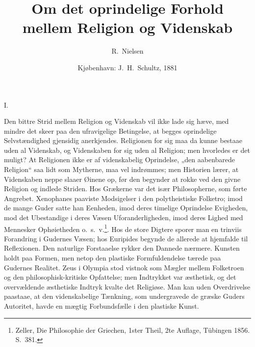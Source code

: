 \documentclass[12pt,a4paper]{article}
\title{\textbf{Om det oprindelige Forhold\\[4pt]
       mellem Religion og Videnskab}}
\author{R.\ Nielsen}
\date{Kjøbenhavn: J.\ H.\ Schultz, 1881}
\newcommand{\opage}[1]{\marginnote{\footnotesize\textit{[#1]}}}
\begin{document}
\maketitle
\thispagestyle{fancy}

\bigskip

\begin{center}I.\end{center}

\noindent Den bittre Strid mellem Religion og Videnskab vil ikke lade
sig hæve, med mindre det skeer paa den ufravigelige Betingelse,
at begges oprindelige Selvstændighed gjensidig anerkjendes. Religionen
for sig maa da kunne bestaae uden al Videnskab, og Videnskaben for sig
uden al Religion; men hvorledes er det muligt? At Religionen ikke er
af videnskabelig Oprindelse, „den aabenbarede Religion“ saa lidt som
Mytherne, maa vel indrømmes; men Historien lærer, at Videnskaben neppe
slaaer Øinene op, før den begynder at rokke ved den givne Religion og
indlede Striden. Hos Grækerne var det især Philosopherne, som førte
Angrebet. Xenophanes paaviste Modsigelser i den polytheistiske
Folketro; imod de mange Guder satte han Eenheden, imod deres timelige
Oprindelse Evigheden, mod det Ubestandige i deres Væsen
Uforanderligheden, imod deres Lighed med Mennesker Ophøietheden
o.\ s.\ v.\footnote{Zeller, Die Philosophie der Griechen, 1ster
Theil, 2te Auflage, Tübingen 1856. S.\ 381.}. %
Hos de store Digtere
sporer man en trinviis Forandring i Gudernes Væsen; hos Euripides begynde
de allerede at hjemfalde til Reflexionen. Den naturlige Forstaaelse
rykker den Dannede nærmere. Kunsten holdt paa Formen, men netop den
plastiske Formfuldendelse tærede paa Gudernes Realitet. Zeus i Olympia
stod vistnok som Mægler mellem Folketroen og den philosophisk-kritiske
Opfattelse; men Indtrykket var æsthetisk, og det overvældende æsthetiske
Indtryk kvalte det Religiøse. Man \opage{2} kan uden Overdrivelse paastaae, at
den videnskabelige Tænkning, som undergravede de græske Guders
Autoritet, havde en mægtig Forbundsfælle i den plastiske Kunst.
\end{document}
